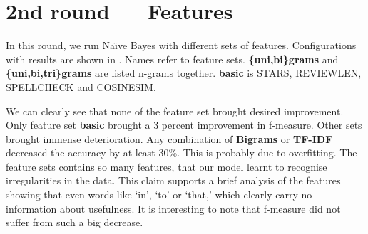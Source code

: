\section{2nd round --- Features}

In this round, we run Na\"{\i}ve Bayes with different sets of features.
Configurations with results are shown in .
Names refer to feature sets.
\textbf{\{uni,bi\}grams} and \textbf{\{uni,bi,tri\}grams} are listed n-grams together.
\textbf{basic} is STARS, REVIEWLEN, SPELLCHECK and COSINESIM.

We can clearly see that none of the feature set brought desired improvement.
Only feature set \textbf{basic} brought a 3 percent improvement in f-measure.
Other sets brought immense deterioration.
Any combination of \textbf{Bigrams} or \textbf{TF-IDF} decreased the accuracy by at least 30\%.
This is probably due to overfitting.
The feature sets contains so many features, that our model learnt to recognise
irregularities in the data.
This claim supports a brief analysis of the features showing that
even words like `in', `to' or `that,' which clearly carry no information about usefulness.
It is interesting to note that f-measure did not suffer from such a big decrease.



